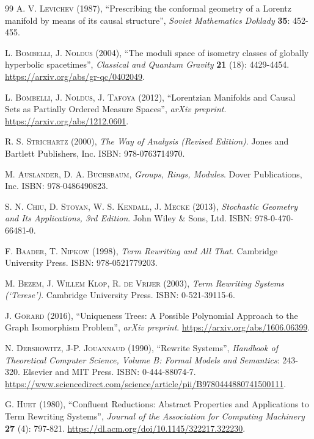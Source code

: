 \documentclass{article}
\begin{document}
\begin{thebibliography}{99}
\textsc{A. V. Levichev} (1987), ``Prescribing the conformal geometry of a Lorentz manifold by means of its causal structure'', \textit{Soviet Mathematics Doklady} \textbf{35}: 452-455.

\textsc{L. Bombelli, J. Noldus} (2004), ``The moduli space of isometry classes of globally hyperbolic spacetimes'', \textit{Classical and Quantum Gravity} \textbf{21} (18): 4429-4454. \url{https://arxiv.org/abs/gr-qc/0402049}.

\textsc{L. Bombelli, J. Noldus, J. Tafoya} (2012), ``Lorentzian Manifolds and Causal Sets as Partially Ordered Measure Spaces'', \textit{arXiv preprint}. \url{https://arxiv.org/abs/1212.0601}.

\textsc{R. S. Strichartz} (2000), \textit{The Way of Analysis (Revised Edition)}. Jones and Bartlett Publishers, Inc. ISBN: 978-0763714970.

\textsc{M. Auslander, D. A. Buchsbaum}, \textit{Groups, Rings, Modules}. Dover Publications, Inc. ISBN: 978-0486490823.

\textsc{S. N. Chiu, D. Stoyan, W. S. Kendall, J. Mecke} (2013), \textit{Stochastic Geometry and Its Applications, 3rd Edition}. John Wiley \& Sons, Ltd. ISBN: 978-0-470-66481-0.

\textsc{F. Baader, T. Nipkow} (1998), \textit{Term Rewriting and All That}. Cambridge University Press. ISBN: 978-0521779203.

\textsc{M. Bezem, J. Willem Klop, R. de Vrijer} (2003), \textit{Term Rewriting Systems (`Terese')}. Cambridge University Press. ISBN: 0-521-39115-6.

\textsc{J. Gorard} (2016), ``Uniqueness Trees: A Possible Polynomial Approach to the Graph Isomorphism Problem'', \textit{arXiv preprint}. \url{https://arxiv.org/abs/1606.06399}.

\textsc{N. Dershowitz, J-P. Jouannaud} (1990), ``Rewrite Systems'', \textit{Handbook of Theoretical Computer Science, Volume B: Formal Models and Semantics}: 243-320. Elsevier and MIT Press. ISBN: 0-444-88074-7. \url{https://www.sciencedirect.com/science/article/pii/B9780444880741500111}.

\textsc{G. Huet} (1980), ``Confluent Reductions: Abstract Properties and Applications to Term Rewriting Systems'', \textit{Journal of the Association for Computing Machinery} \textbf{27} (4): 797-821. \url{https://dl.acm.org/doi/10.1145/322217.322230}.


\end{thebibliography}
\end{document}
